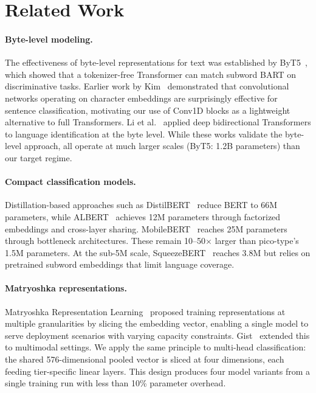 \documentclass[11pt,a4paper]{article}
\begin{document}
\section{Related Work}
\label{sec:related}

\paragraph{Byte-level modeling.}
The effectiveness of byte-level representations for text was established by ByT5~\cite{byt5}, which showed that a tokenizer-free Transformer can match subword BART on discriminative tasks.
Earlier work by Kim~\cite{kim2014conv} demonstrated that convolutional networks operating on character embeddings are surprisingly effective for sentence classification, motivating our use of Conv1D blocks as a lightweight alternative to full Transformers.
Li et al.~\cite{blili} applied deep bidirectional Transformers to language identification at the byte level.
While these works validate the byte-level approach, all operate at much larger scales (ByT5: 1.2B parameters) than our target regime.

\paragraph{Compact classification models.}
Distillation-based approaches such as DistilBERT~\cite{distilbert} reduce BERT to 66M parameters, while ALBERT~\cite{albert} achieves 12M parameters through factorized embeddings and cross-layer sharing.
MobileBERT~\cite{mobilebert} reaches 25M parameters through bottleneck architectures.
These remain 10--50$\times$ larger than pico-type's 1.5M parameters.
At the sub-5M scale, SqueezeBERT~\cite{squeezebert} reaches 3.8M but relies on pretrained subword embeddings that limit language coverage.

\paragraph{Matryoshka representations.}
Matryoshka Representation Learning~\cite{matryoshka} proposed training representations at multiple granularities by slicing the embedding vector, enabling a single model to serve deployment scenarios with varying capacity constraints.
Gist~\cite{gist} extended this to multimodal settings.
We apply the same principle to multi-head classification: the shared 576-dimensional pooled vector is sliced at four dimensions, each feeding tier-specific linear layers.
This design produces four model variants from a single training run with less than 10\% parameter overhead.
\end{document}
